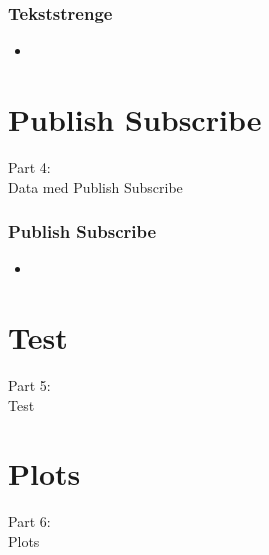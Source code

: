 \begin{frame}
    \frametitle{Tekststrenge}
    \begin{itemize}
      \item 
    \end{itemize}
\end{frame}

\section{Publish Subscribe}
\begin{frame}
    \vspace{25mm}
    \begin{center}
        \Huge{Part 4:\\Data med Publish Subscribe}
    \end{center}
\end{frame}

\begin{frame}
    \frametitle{Publish Subscribe}
    \begin{itemize}
      \item 
    \end{itemize}
\end{frame}

\section{Test}
\begin{frame}
    \vspace{25mm}
    \begin{center}
        \Huge{Part 5:\\Test}
    \end{center}
\end{frame}

\section{Plots}
\begin{frame}
    \vspace{25mm}
    \begin{center}
        \Huge{Part 6:\\Plots}
    \end{center}
\end{frame}

